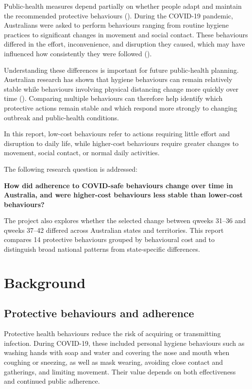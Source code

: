 \documentclass[
  12pt,
  a4paper,
]{article}
\begin{document}
Public-health measures depend partially on whether people adapt and
maintain the recommended protective behaviours ().
During the COVID-19 pandemic, Australians were asked to perform
behaviours ranging from routine hygiene practices to significant changes
in movement and social contact. These behaviours differed in the effort,
inconvenience, and disruption they caused, which may have influenced
how consistently they were followed ().

Understanding these differences is important for future public-health
planning. Australian research has shown that hygiene behaviours can
remain relatively stable while behaviours involving physical
distancing change more quickly over time ().
Comparing multiple behaviours can therefore help identify which
protective actions remain stable and which respond more strongly to
changing outbreak and public-health conditions.

In this report, low-cost behaviours refer to actions requiring
little effort and disruption to daily life, while higher-cost behaviours
require greater changes to movement, social contact, or normal daily
activities.

The following research question is addressed:

\textbf{How did adherence to COVID-safe behaviours change over time in
Australia, and were higher-cost behaviours less stable than lower-cost
behaviours?}

The project also explores whether the selected change between qweeks
31--36 and qweeks 37--42 differed across Australian states and
territories. This report compares 14 protective behaviours
grouped by behavioural cost and to distinguish broad national
patterns from state-specific differences.

\section{Background}\label{background}

\subsection{Protective behaviours and adherence}\label{protective-behaviours-and-adherence}

Protective health behaviours reduce the risk of acquiring or
transmitting infection. During COVID-19, these included personal hygiene
behaviours such as washing hands with soap and water and covering the
nose and mouth when coughing or sneezing, as well as mask wearing,
avoiding close contact and gatherings, and limiting movement. Their
value depends on both effectiveness and continued public adherence.
\end{document}
